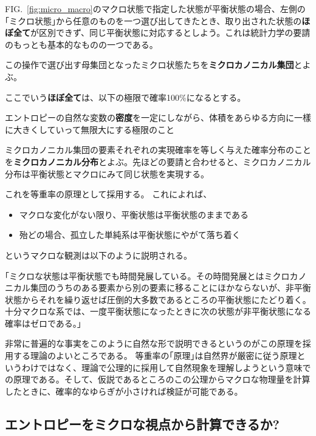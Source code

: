 \documentclass[
]{ltjsbook}
\providecommand{\tightlist}{%
  \setlength{\itemsep}{0pt}\setlength{\parskip}{0pt}}
\begin{document}
FIG.~\ref{fig:micro_macro}のマクロ状態で指定した状態が平衡状態の場合、左側の｢ミクロ状態｣から任意のものを一つ選び出してきたとき、取り出された状態の\textbf{ほぼ全て}が区別できず、同じ平衡状態に対応するとしよう。これは統計力学の要請のもっとも基本的なものの一つである。

この操作で選び出す母集団となったミクロ状態たちを\textbf{ミクロカノニカル集団}とよぶ。

ここでいう\textbf{ほぼ全て}は、以下の極限で確率100\%になるとする。

\begin{description}
\tightlist
\item[熱力学極限]
エントロピーの自然な変数の\textbf{密度}を一定にしながら、体積をあらゆる方向に一樣に大きくしていって無限大にする極限のこと
\end{description}

ミクロカノニカル集団の要素それぞれの実現確率を等しく与えた確率分布のことを\textbf{ミクロカノニカル分布}とよぶ。先ほどの要請と合わせると、ミクロカノニカル分布は平衡状態とマクロにみて同じ状態を実現する。

これを等重率の原理として採用する。 これによれば、

\begin{itemize}
\tightlist
\item
  マクロな変化がない限り、平衡状態は平衡状態のままである
\item
  殆どの場合、孤立した単純系は平衡状態にやがて落ち着く
\end{itemize}

というマクロな観測は以下のように説明される。

｢ミクロな状態は平衡状態でも時間発展している。その時間発展とはミクロカノニカル集団のうちのある要素から別の要素に移ることにほかならないが、非平衡状態からそれを繰り返せば圧倒的大多数であるところの平衡状態にたどり着く。十分マクロな系では、一度平衡状態になったときに次の状態が非平衡状態になる確率はゼロである。｣

非常に普遍的な事実をこのように自然な形で説明できるというのがこの原理を採用する理論のよいところである。
等重率の｢原理｣は自然界が厳密に従う原理というわけではなく、理論で公理的に採用して自然現象を理解しようという意味での原理である。そして、仮説であるところのこの公理からマクロな物理量を計算したときに、確率的なゆらぎが小さければ検証が可能である。

\hypertarget{ux30a8ux30f3ux30c8ux30edux30d4ux30fcux3092ux30dfux30afux30edux306aux8996ux70b9ux304bux3089ux8a08ux7b97ux3067ux304dux308bux304b}{%
\subsection{エントロピーをミクロな視点から計算できるか?}\label{ux30a8ux30f3ux30c8ux30edux30d4ux30fcux3092ux30dfux30afux30edux306aux8996ux70b9ux304bux3089ux8a08ux7b97ux3067ux304dux308bux304b}}
\end{document}
